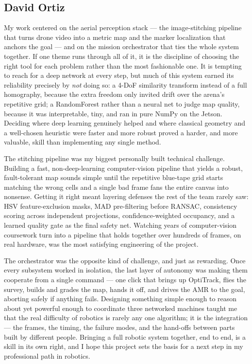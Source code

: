 \documentclass[11pt]{article}
\begin{document}
\subsection*{David Ortiz}
My work centered on the aerial perception stack --- the image-stitching pipeline
that turns drone video into a metric map and the marker localization that anchors
the goal --- and on the mission orchestrator that ties the whole system together.
If one theme runs through all of it, it is the discipline of choosing the right
tool for each problem rather than the most fashionable one. It is tempting to
reach for a deep network at every step, but much of this system earned its
reliability precisely by \emph{not} doing so: a 4-DoF similarity transform instead
of a full homography, because the extra freedom only invited drift over the
arena's repetitive grid; a RandomForest rather than a neural net to judge map
quality, because it was interpretable, tiny, and ran in pure NumPy on the Jetson.
Deciding where deep learning genuinely helped and where classical geometry and a
well-chosen heuristic were faster and more robust proved a harder, and more
valuable, skill than implementing any single method.

The stitching pipeline was my biggest personally built technical challenge.
Building a fast, non-deep-learning computer-vision pipeline that yields a robust,
fault-tolerant map sounds simple until the repetitive blue-tape grid starts
matching the wrong cells and a single bad frame fans the entire canvas into
nonsense. Getting it right meant layering defenses the rest of the team rarely
saw: HSV feature-exclusion masks, MAD pre-filtering before RANSAC, consistency
scoring across independent projections, confidence-weighted occupancy, and a
learned quality gate as the final safety net. Watching years of computer-vision
coursework turn into a pipeline that holds together over hundreds of frames, on
real hardware, was the most satisfying engineering of the project.

The orchestrator was the opposite kind of challenge, and just as rewarding. Once
every subsystem worked in isolation, the last layer of autonomy was making them
cooperate from a single command --- one click that brings up OptiTrack, flies the
survey, builds and grades the map, hands it off, and drives the AMR to the goal,
aborting safely if anything fails. Designing something simple enough to reason
about yet powerful enough to coordinate three networked machines taught me that
the real difficulty of robotics is rarely any one algorithm; it is the
integration --- the frames, the timing, the failure modes, and the hand-offs
between parts built by different people. Bringing a full robotic system together,
end to end, is a skill in its own right, and I hope this project sets the basis
for a next step in my professional path in robotics.
\vspace{4em}
\end{document}
